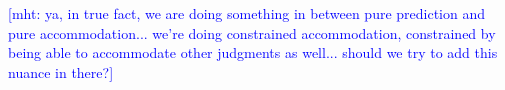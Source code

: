 \documentclass[doc]{apa6}
\newcommand{\mht}[1]{\textcolor{Blue}{[mht: #1]}}
\begin{document}
\mht{ya, in true fact, we are doing something in between pure prediction and pure accommodation... we're doing constrained accommodation, constrained by being able to accommodate other judgments as well... should we try to add this nuance in there?}


\end{document}
